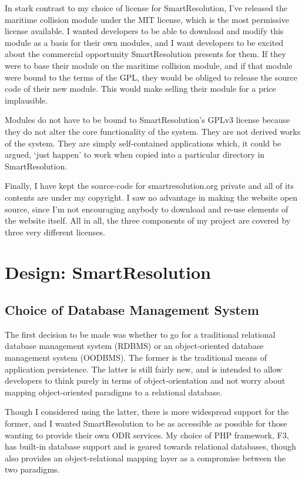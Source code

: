 In stark contrast to my choice of license for SmartResolution, I've released the maritime collision module under the MIT license, which is the most permissive license available. I wanted developers to be able to download and modify this module as a basis for their own modules, and I want developers to be excited about the commercial opportunity SmartResolution presents for them. If they were to base their module on the maritime collision module, and if that module were bound to the terms of the GPL, they would be obliged to release the source code of their new module. This would make selling their module for a price implausible.

Modules do not have to be bound to SmartResolution's GPLv3 license because they do not alter the core functionality of the system. They are not derived works of the system. They are simply self-contained applications which, it could be argued, `just happen' to work when copied into a particular directory in SmartResolution.

Finally, I have kept the source-code for smartresolution.org private and all of its contents are under my copyright. I saw no advantage in making the website open source, since I'm not encouraging anybody to download and re-use elements of the website itself. All in all, the three components of my project are covered by three very different licenses.

\section{Design: SmartResolution}

\subsection{Choice of Database Management System}

The first decision to be made was whether to go for a traditional relational database management system (RDBMS) or an object-oriented database management system (OODBMS). The former is the traditional means of application persistence. The latter is still fairly new, and is intended to allow developers to think purely in terms of object-orientation and not worry about mapping object-oriented paradigms to a relational database.

Though I considered using the latter, there is more widespread support for the former, and I wanted SmartResolution to be as accessible as possible for those wanting to provide their own ODR services. My choice of PHP framework, F3, has built-in database support and is geared towards relational databases, though also provides an object-relational mapping layer as a compromise between the two paradigms.~\cite{f3:objectRelationalMapping}

